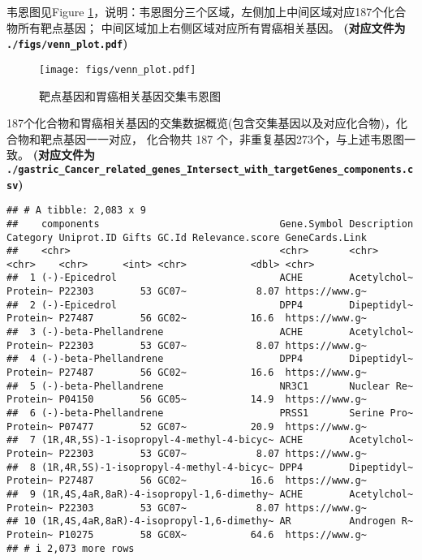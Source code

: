 \documentclass[
]{article}
\begin{document}
韦恩图见Figure \ref{fig:fig2}，说明：韦恩图分三个区域，左侧加上中间区域对应187个化合物所有靶点基因；
中间区域加上右侧区域对应所有胃癌相关基因。
\textbf{(对应文件为 \texttt{./figs/venn\_plot.pdf})}

\begin{figure}
\centering
\texttt{[image: figs/venn\_plot.pdf]}
\caption{\label{fig:fig2}靶点基因和胃癌相关基因交集韦恩图}
\end{figure}

187个化合物和胃癌相关基因的交集数据概览(包含交集基因以及对应化合物)，化合物和靶点基因一一对应，
化合物共 187 个，非重复基因273个，与上述韦恩图一致。
\textbf{(对应文件为 \texttt{./gastric\_Cancer\_related\_genes\_Intersect\_with\_targetGenes\_components.csv})}

\begin{verbatim}
## # A tibble: 2,083 x 9
##    components                               Gene.Symbol Description Category Uniprot.ID Gifts GC.Id Relevance.score GeneCards.Link
##    <chr>                                    <chr>       <chr>       <chr>    <chr>      <int> <chr>           <dbl> <chr>         
##  1 (-)-Epicedrol                            ACHE        Acetylchol~ Protein~ P22303        53 GC07~            8.07 https://www.g~
##  2 (-)-Epicedrol                            DPP4        Dipeptidyl~ Protein~ P27487        56 GC02~           16.6  https://www.g~
##  3 (-)-beta-Phellandrene                    ACHE        Acetylchol~ Protein~ P22303        53 GC07~            8.07 https://www.g~
##  4 (-)-beta-Phellandrene                    DPP4        Dipeptidyl~ Protein~ P27487        56 GC02~           16.6  https://www.g~
##  5 (-)-beta-Phellandrene                    NR3C1       Nuclear Re~ Protein~ P04150        56 GC05~           14.9  https://www.g~
##  6 (-)-beta-Phellandrene                    PRSS1       Serine Pro~ Protein~ P07477        52 GC07~           20.9  https://www.g~
##  7 (1R,4R,5S)-1-isopropyl-4-methyl-4-bicyc~ ACHE        Acetylchol~ Protein~ P22303        53 GC07~            8.07 https://www.g~
##  8 (1R,4R,5S)-1-isopropyl-4-methyl-4-bicyc~ DPP4        Dipeptidyl~ Protein~ P27487        56 GC02~           16.6  https://www.g~
##  9 (1R,4S,4aR,8aR)-4-isopropyl-1,6-dimethy~ ACHE        Acetylchol~ Protein~ P22303        53 GC07~            8.07 https://www.g~
## 10 (1R,4S,4aR,8aR)-4-isopropyl-1,6-dimethy~ AR          Androgen R~ Protein~ P10275        58 GC0X~           64.6  https://www.g~
## # i 2,073 more rows
\end{verbatim}
\end{document}
